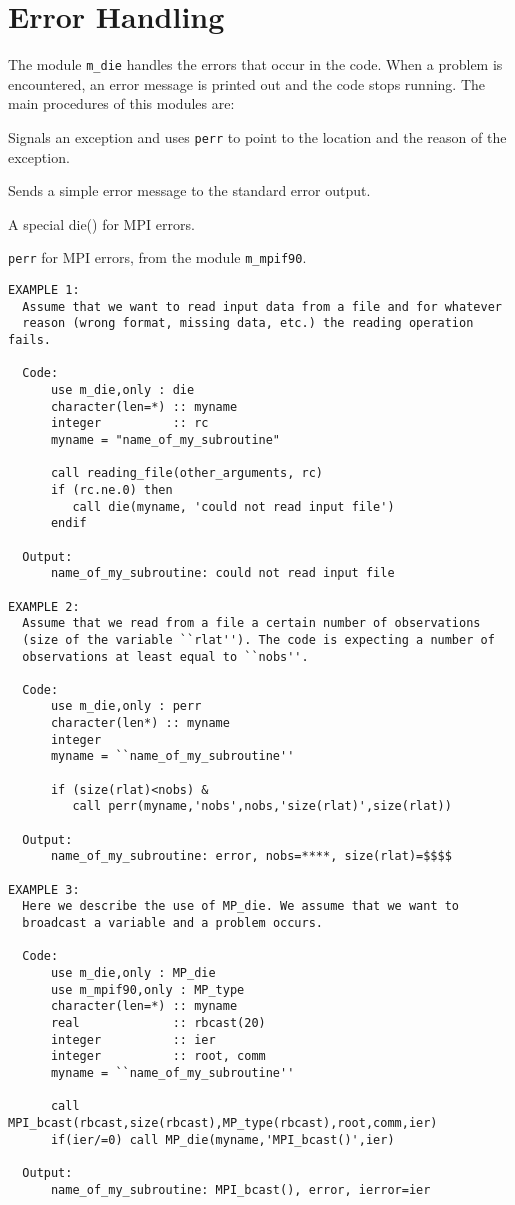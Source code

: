 % 
\section{Error Handling}
%
The module {\tt m\_die} handles the errors that occur in the code.
When a problem is encountered, an error message is printed out and 
the code stops running.
The main procedures of this modules are:

 Signals an exception and uses {\tt perr} to point to
the location and the reason of the exception.

 Sends a simple error message to the standard error
output.

 A special die() for MPI errors.

 {\tt perr} for MPI errors, from the module
   {\tt m\_mpif90}.
%
\begin{verbatim}
EXAMPLE 1:
  Assume that we want to read input data from a file and for whatever
  reason (wrong format, missing data, etc.) the reading operation fails.

  Code:
      use m_die,only : die
      character(len=*) :: myname
      integer          :: rc
      myname = "name_of_my_subroutine"
      
      call reading_file(other_arguments, rc)
      if (rc.ne.0) then
         call die(myname, 'could not read input file')
      endif

  Output:
      name_of_my_subroutine: could not read input file

EXAMPLE 2:
  Assume that we read from a file a certain number of observations
  (size of the variable ``rlat''). The code is expecting a number of
  observations at least equal to ``nobs''.

  Code:
      use m_die,only : perr
      character(len*) :: myname
      integer
      myname = ``name_of_my_subroutine''

      if (size(rlat)<nobs) &
         call perr(myname,'nobs',nobs,'size(rlat)',size(rlat))

  Output:
      name_of_my_subroutine: error, nobs=****, size(rlat)=$$$$

EXAMPLE 3:
  Here we describe the use of MP_die. We assume that we want to
  broadcast a variable and a problem occurs.
 
  Code:
      use m_die,only : MP_die
      use m_mpif90,only : MP_type
      character(len=*) :: myname
      real             :: rbcast(20)
      integer          :: ier
      integer          :: root, comm
      myname = ``name_of_my_subroutine''
      
      call MPI_bcast(rbcast,size(rbcast),MP_type(rbcast),root,comm,ier)
      if(ier/=0) call MP_die(myname,'MPI_bcast()',ier)

  Output:
      name_of_my_subroutine: MPI_bcast(), error, ierror=ier

\end{verbatim}
 
